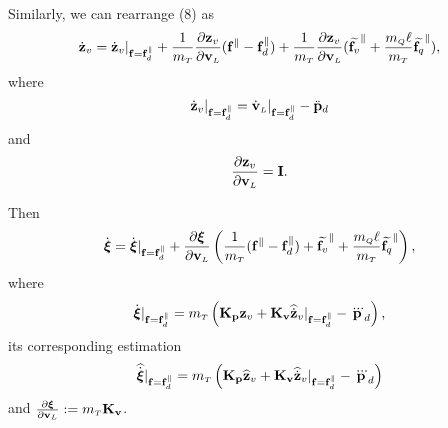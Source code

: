 \documentclass[journal,onecolumn]{IEEEtran}
\begin{document}
	Similarly, we can rearrange (8) as
	\begin{equation}
		\zvdot = \zvdot|_{\f=\fd^{\|}} + \frac{1}{\mT}\frac{\partial\zv}{\partial\vL}(\f^{\|}-\fd^{\|}) + \frac{1}{\mT}\frac{\partial\zv}{\partial\vL}(\widetilde{\f_v}^{\|} + \frac{\mQ\ellp}{\mT}\widetilde{\f_q}^{\|}),
		\label{eq:zv_dot_aux1}
	\end{equation}
	where
	\begin{equation}
		\zvdot|_{\f=\fd^{\|}} = \vLdot|_{\f=\fd^{\|}} - \pLdddot
	\end{equation}
	and
	\begin{equation}
		\frac{\partial\zv}{\partial\vL} = \v{I}.
	\end{equation}

Then
%
\begin{align}
	\dot{\Xiq} = \dot{\Xiq}|_{\f=\fd^{\|}} + \frac{\partial \Xiq}{\partial \vL}\LP\frac{1}{\mT}(\f^{\|}-\fd^{\|}) + \widetilde{\f_v}^{\|} + \frac{\mQ\ellp}{\mT}\widetilde{\f_q}^{\|}\RP,
\end{align}
%
where
%
\begin{align}
	\dot{\Xiq}|_{\f=\fd^{\|}} = \mT\LP {\bf K_p}\zv + {\bf K_v} \zvdothat|_{\f=\fd^{\|}}
	- \pLdtdot\RP,
\end{align}
%
its corresponding estimation
%
\begin{align}
	\widehat{\dot{\Xiq}}|_{\f=\fd^{\|}} = \mT\LP {\bf K_p}\zvhat + {\bf K_v} \zvdothat|_{\f=\fd^{\|}}
	- \pLdtdot\RP
\end{align}
%
and $\frac{\partial \Xiq}{\partial \vL}:=\mT{\bf K_v}$.
\end{document}
